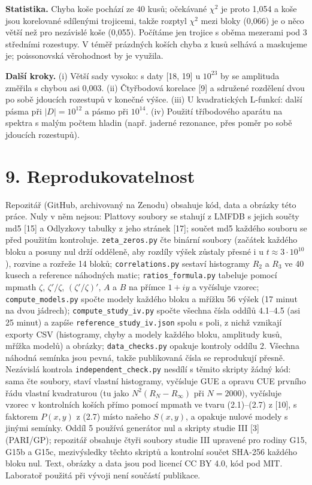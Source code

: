 \documentclass[
  10pt,
]{article}
\begin{document}
\textbf{Statistika.} Chyba koše pochází ze 40 kusů; očekávané \(\chi^2\)
je proto 1,054 a koše jsou korelované sdílenými trojicemi, takže rozptyl
\(\chi^2\) mezi bloky (0,066) je o něco větší než pro nezávislé koše
(0,055). Počítáme jen trojice s oběma mezerami pod 3 středními
rozestupy. V téměř prázdných koších chyba z kusů selhává a maskujeme je;
poissonovská věrohodnost by je využila.

\textbf{Další kroky.} (i) Větší sady vysoko: s daty {[}18, 19{]} u
\(10^{23}\) by se amplituda změřila s chybou asi 0,003. (ii) Čtyřbodová
korelace {[}9{]} a sdružené rozdělení dvou po sobě jdoucích rozestupů v
konečné výšce. (iii) U kvadratických L-funkcí: další pásma při
\(|D| = 10^{12}\) a pásmo při \(10^{14}\). (iv) Použití tříbodového
aparátu na spektra s malým počtem hladin (např. jaderné rezonance, přes
poměr po sobě jdoucích rozestupů).

\hypertarget{reprodukovatelnost}{%
\section{9. Reprodukovatelnost}\label{reprodukovatelnost}}

Repozitář (GitHub, archivovaný na Zenodu) obsahuje kód, data a obrázky
této práce. Nuly v něm nejsou: Plattovy soubory se stahují z LMFDB s
jejich součty md5 {[}15{]} a Odlyzkovy tabulky z jeho stránek {[}17{]};
součet md5 každého souboru se před použitím kontroluje.
\texttt{zeta\_zeros.py} čte binární soubory (začátek každého bloku a
posuny nul drží odděleně, aby rozdíly výšek zůstaly přesné i u
\(t \approx 3\cdot10^{10}\)), rozvine a rozřeže 14 bloků;
\texttt{correlations.py} sestaví histogramy \(R_2\) a \(R_3\) ve 40
kusech a reference náhodných matic; \texttt{ratios\_formula.py} tabeluje
pomocí mpmath \(\zeta\), \(\zeta'/\zeta\), \((\zeta'/\zeta)'\), \(A\) a
\(B\) na přímce \(1 + iy\) a vyčísluje vzorec;
\texttt{compute\_models.py} spočte modely každého bloku a mřížku 56
výšek (17 minut na dvou jádrech); \texttt{compute\_study\_iv.py} spočte
všechna čísla oddílů 4.1--4.5 (asi 25 minut) a zapíše
\texttt{reference\_study\_iv.json} spolu s poli, z nichž vznikají
exporty CSV (histogramy, chyby a modely každého bloku, amplitudy kusů,
mřížka modelů) a obrázky; \texttt{data\_checks.py} opakuje kontroly
oddílu 2. Všechna náhodná semínka jsou pevná, takže publikovaná čísla se
reprodukují přesně. Nezávislá kontrola \texttt{independent\_check.py}
nesdílí s těmito skripty žádný kód: sama čte soubory, staví vlastní
histogramy, vyčísluje GUE a opravu CUE prvního řádu vlastní kvadraturou
(tu jako \(N^2(R_N - R_\infty)\) při \(N = 2000\)), vyčísluje vzorec v
kontrolních koších přímo pomocí mpmath ve tvaru (2.1)--(2.7) z {[}10{]},
s faktorem \(P(x, y)\) z (2.7) místo našeho \(S(x, y)\), a opakuje
nulové modely s jinými semínky. Oddíl 5 používá generátor nul a skripty
studie III {[}3{]} (PARI/GP); repozitář obsahuje čtyři soubory studie
III upravené pro rodiny G15, G15b a G15c, mezivýsledky těchto skriptů a
kontrolní součet SHA-256 každého bloku nul. Text, obrázky a data jsou
pod licencí CC BY 4.0, kód pod MIT. Laboratoř použitá při vývoji není
součástí publikace.
\end{document}
